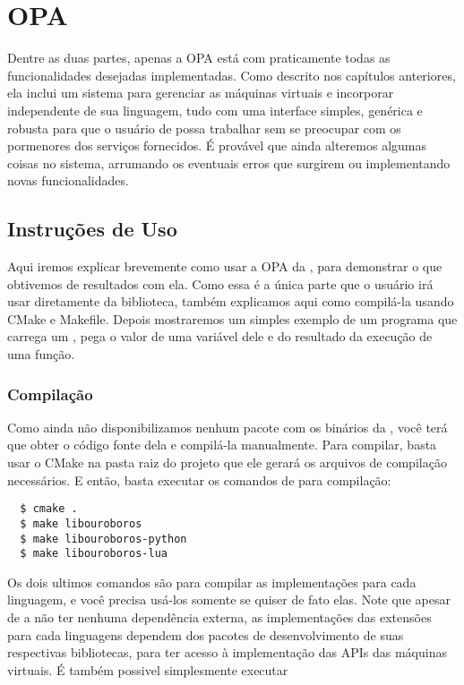 \section{OPA}
\label{cap:resultados:opa}

Dentre as duas partes, apenas a OPA está com praticamente todas as
funcionalidades desejadas implementadas. Como descrito nos capítulos
anteriores, ela inclui um sistema para gerenciar as máquinas virtuais
e incorporar  independente de sua linguagem, tudo com uma
interface simples, genérica e robusta para que o usuário de \CXX{} possa
trabalhar sem se preocupar com os pormenores dos serviços fornecidos. É
provável que ainda alteremos algumas coisas no sistema, arrumando os
eventuais erros que surgirem ou implementando novas funcionalidades.

\subsection{Instruções de Uso}
Aqui iremos explicar brevemente como usar a OPA da ,
para demonstrar o que obtivemos de resultados com ela. Como
essa é a única parte que o usuário irá usar diretamente da biblioteca, também
explicamos aqui como compilá-la usando CMake e Makefile. Depois mostraremos
um simples exemplo de um programa que carrega um \script{}, pega o valor de uma
variável dele e do resultado da execução de uma função.

\subsubsection{Compilação} 
Como ainda não disponibilizamos nenhum pacote
com os binários da , você terá que obter o código fonte dela
e compilá-la manualmente. Para compilar, basta usar o CMake na pasta 
raiz do projeto que ele gerará os arquivos de compilação necessários.
E então, basta executar os comandos de  para compilação:

\begin{verbatim}
  $ cmake .
  $ make libouroboros
  $ make libouroboros-python
  $ make libouroboros-lua
\end{verbatim}

Os dois ultimos comandos são para compilar as implementações para cada linguagem,
e você precisa usá-los somente se quiser de fato elas. Note que apesar de a
 não ter nenhuma dependência externa, as implementações
das extensões para cada linguagens dependem dos pacotes de desenvolvimento de suas
respectivas bibliotecas, para ter acesso à implementação das APIs das máquinas virtuais.
É também possivel simplesmente executar

